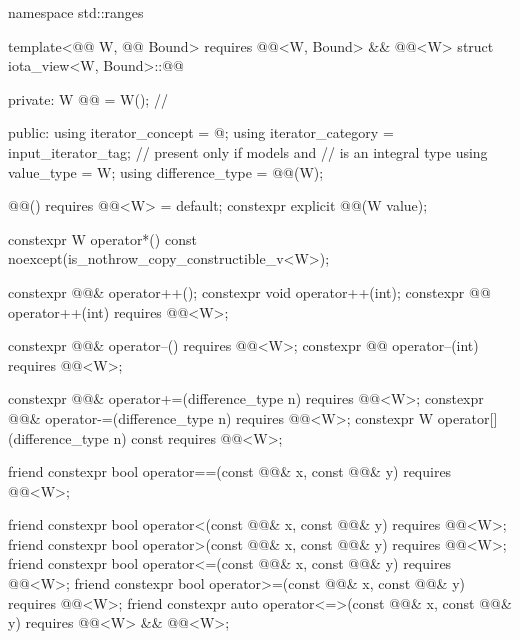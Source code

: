 %
\begin{codeblock}
namespace std::ranges {
  template<@@ W, @@ Bound>
    requires @@<W, Bound> && @@<W>
  struct iota_view<W, Bound>::@@ {
  private:
    W @@ = W();             // \expos

  public:
    using iterator_concept = @\seebelow@;
    using iterator_category = input_iterator_tag;       // present only if  models  and
                                                        //  is an integral type
    using value_type = W;
    using difference_type = @@(W);

    @@() requires @@<W> = default;
    constexpr explicit @@(W value);

    constexpr W operator*() const noexcept(is_nothrow_copy_constructible_v<W>);

    constexpr @@& operator++();
    constexpr void operator++(int);
    constexpr @@ operator++(int) requires @@<W>;

    constexpr @@& operator--() requires @@<W>;
    constexpr @@ operator--(int) requires @@<W>;

    constexpr @@& operator+=(difference_type n)
      requires @@<W>;
    constexpr @@& operator-=(difference_type n)
      requires @@<W>;
    constexpr W operator[](difference_type n) const
      requires @@<W>;

    friend constexpr bool operator==(const @@& x, const @@& y)
      requires @@<W>;

    friend constexpr bool operator<(const @@& x, const @@& y)
      requires @@<W>;
    friend constexpr bool operator>(const @@& x, const @@& y)
      requires @@<W>;
    friend constexpr bool operator<=(const @@& x, const @@& y)
      requires @@<W>;
    friend constexpr bool operator>=(const @@& x, const @@& y)
      requires @@<W>;
    friend constexpr auto operator<=>(const @@& x, const @@& y)
      requires @@<W> && @@<W>;

}}
\end{codeblock}
